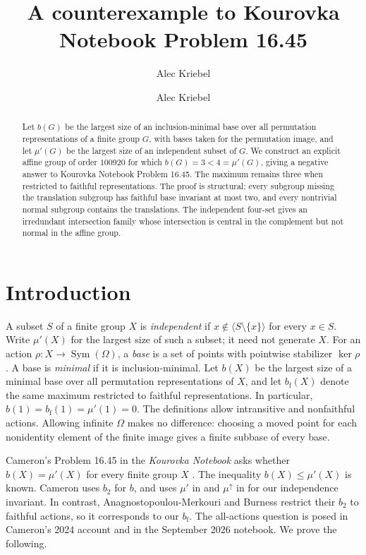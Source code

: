 \IfFileExists{baustms.cls}{\bulletinformattrue\documentclass[plain]{baustms}}{\bulletinformatfalse\documentclass[11pt]{amsart}}
\title{A counterexample to Kourovka Notebook Problem 16.45}
\author[1]{Alec Kriebel}
\author{Alec Kriebel}
\date{}
\theoremstyle{cupthm}
\newcommand{\mup}{\mu'}
\newcommand{\bfth}{b_{\mathrm f}}
\newcommand{\Sym}{\operatorname{Sym}}
\begin{document}
\begin{abstract}
Let $b(G)$ be the largest size of an inclusion-minimal base over all
permutation representations of a finite group $G$, with bases taken for the
permutation image, and let $\mup(G)$ be the largest size of an independent
subset of $G$. We construct an explicit affine group of order $100920$ for
which $b(G)=3<4=\mup(G)$, giving a negative answer to Kourovka Notebook
Problem 16.45. The maximum remains three when restricted to faithful
representations. The proof is structural: every subgroup missing the
translation subgroup has faithful base invariant at most two, and every
nontrivial normal subgroup contains the translations. The independent
four-set gives an irredundant intersection family whose intersection is
central in the complement but not normal in the affine group.
\end{abstract}
\maketitle

\section{Introduction}
A subset $S$ of a finite group $X$ is \emph{independent} if
$x\notin\langle S\setminus\{x\}\rangle$ for every $x\in S$.
Write $\mup(X)$ for the largest size of such a subset; it need not generate
$X$. For an action $\rho:X\to\Sym(\Omega)$, a \emph{base} is a set of
points with pointwise stabilizer $\ker\rho$. A base is \emph{minimal} if
it is inclusion-minimal. Let $b(X)$ be the largest size of a minimal base
over all permutation representations of $X$, and let $\bfth(X)$ denote
the same maximum restricted to faithful representations. In particular,
$b(1)=\bfth(1)=\mup(1)=0$. The definitions allow intransitive and
nonfaithful actions. Allowing infinite $\Omega$ makes no difference:
choosing a moved point for each nonidentity element of the finite image
gives a finite subbase of every base.

Cameron's Problem 16.45 in the \emph{Kourovka Notebook} asks whether
$b(X)=\mup(X)$ for every finite group $X$ \cite{notebook}.
The inequality $b(X)\le\mup(X)$ is known. Cameron uses $b_2$ for $b$,
and uses $\mu'$ in \cite{cameron2014} and $\mu^\uparrow$ in
\cite{cameron2024} for our independence invariant. In contrast,
Anagnostopoulou-Merkouri and Burness \cite[Remark 1(c)]{ab2024} restrict
their $b_2$ to faithful actions, so it corresponds to our $\bfth$.
The all-actions question is posed in Cameron's 2024 account
\cite[Section 6, Proposition 2 and the following discussion]{cameron2024}
and in the September 2026 notebook.
We prove the following.
\end{document}
